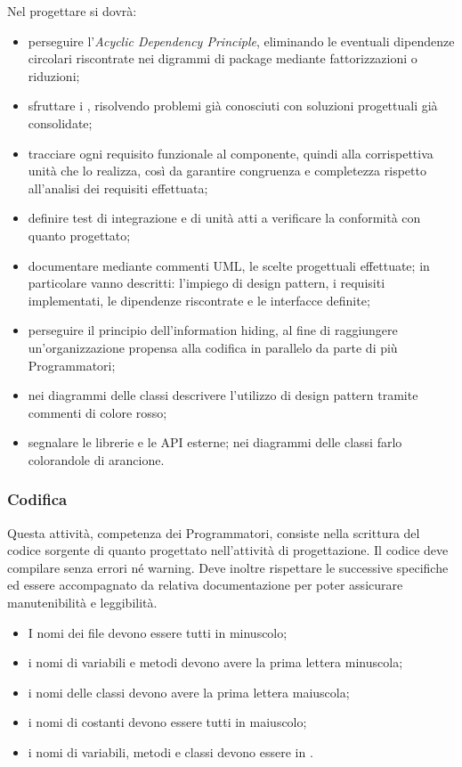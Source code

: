 			Nel progettare si dovrà:
				\begin{itemize}
					\item perseguire l'\textit{Acyclic Dependency Principle}, eliminando le eventuali dipendenze circolari riscontrate nei digrammi di package mediante fattorizzazioni o riduzioni;
					\item sfruttare i , risolvendo problemi già conosciuti con soluzioni progettuali già consolidate;
					\item tracciare ogni requisito funzionale al componente, quindi alla corrispettiva unità che lo realizza, così da garantire congruenza e completezza rispetto all'analisi dei requisiti effettuata;
					\item definire test di integrazione e di unità atti a verificare la conformità con quanto progettato;
					\item documentare mediante commenti UML, le scelte progettuali effettuate; in particolare vanno descritti: l'impiego di design pattern, i requisiti implementati, le dipendenze riscontrate e le interfacce definite;
					\item perseguire il principio dell'information hiding, al fine di raggiungere un'organizzazione propensa alla codifica in parallelo da parte di più Programmatori;
					\item nei diagrammi delle classi descrivere l'utilizzo di design pattern tramite commenti di colore rosso;
					\item segnalare le librerie e le API esterne; nei diagrammi delle classi farlo colorandole di arancione.
				\end{itemize}

\newpage

	\subsubsection{Codifica} \label{codifica}

		Questa attività, competenza dei Programmatori, consiste nella scrittura del codice sorgente di quanto progettato
		nell'attività di progettazione. Il codice deve compilare senza errori né warning. Deve inoltre rispettare le
		successive specifiche ed essere accompagnato da relativa documentazione per poter assicurare manutenibilità e leggibilità.


			\begin{itemize}
				\item I nomi dei file devono essere tutti in minuscolo;
				\item i nomi di variabili e metodi devono avere la prima lettera minuscola;
				\item i nomi delle classi devono avere la prima lettera maiuscola;
				\item i nomi di costanti devono essere tutti in maiuscolo;
				\item i nomi di variabili, metodi e classi devono essere in .
			\end{itemize}
			
